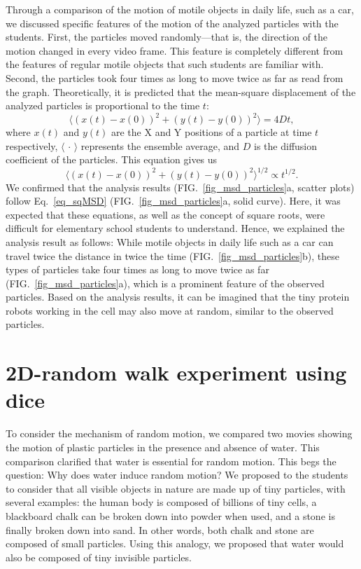 \documentclass[10pt, aps, prb, preprint, longbibliography, superscriptaddress]{revtex4-2}
\newcommand{\figref}[1]{FIG.~\ref{#1}}
\let\orgeqref=\eqref
\renewcommand{\eqref}[1]{Eq.~\orgeqref{#1}}
\newcommand{\ave}[1]{\langle #1 \rangle}
\begin{document}
Through a comparison of the motion of motile objects in daily life, such as a car,
we discussed specific features of the motion of the analyzed particles with the students.
First, the particles moved randomly---that is, the direction of the motion changed in every video frame.
This feature is completely different from the features of regular motile objects
that such students are familiar with.
Second, the particles took four times as long to move twice as far as read from the graph.
Theoretically, it is predicted that the mean-square displacement of the analyzed particles
is proportional to the time $t$\cite{howard_random}:
%
\begin{equation}
	\ave{(x(t) - x(0))^2 + (y(t) - y(0))^2} = 4Dt,
	\label{eq_MSD}
\end{equation}
%
where $x(t)$ and $y(t)$ are the X and Y positions of a particle at time $t$ respectively,
$\ave{\,\cdot\,}$ represents the ensemble average,
and $D$ is the diffusion coefficient of the particles.
This equation gives us
%
\begin{equation}
	\ave{(x(t) - x(0))^2 + (y(t) - y(0))^2}^{1/2} \propto t^{1/2}.
	\label{eq_sqMSD}
\end{equation}
%
We confirmed that the analysis results (\figref{fig_msd_particles}a, scatter plots)
follow \eqref{eq_sqMSD} (\figref{fig_msd_particles}a, solid curve).
Here, it was expected that these equations, as well as the concept of square roots,
were difficult for elementary school students to understand.
Hence, we explained the analysis result as follows:
While motile objects in daily life such as a car can travel twice the distance in twice the time (\figref{fig_msd_particles}b),
these types of particles take four times as long to move twice as far (\figref{fig_msd_particles}a),
which is a prominent feature of the observed particles.
Based on the analysis results, it can be imagined that the tiny protein robots working
in the cell may also move at random, similar to the observed particles.


\section{2D-random walk experiment using dice}
To consider the mechanism of random motion,
we compared two movies showing the motion of plastic particles in the presence and absence of water.
This comparison clarified that water is essential for random motion.
This begs the question: Why does water induce random motion?
We proposed to the students to consider that all visible objects in nature are made up of tiny particles,
with several examples:
the human body is composed of billions of tiny cells,
a blackboard chalk can be broken down into powder when used,
and a stone is finally broken down into sand.
In other words, both chalk and stone are composed of small particles.
Using this analogy, we proposed that water would also be composed of tiny invisible particles.
\end{document}
